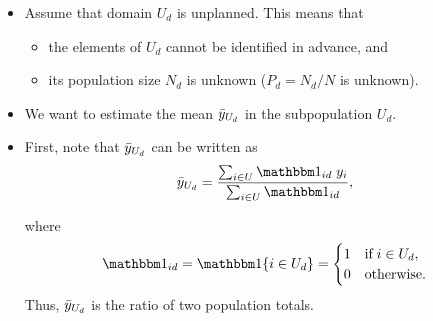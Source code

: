 \documentclass{my_eth_beamer}
\numberwithin{equation}{section}
\begin{document}
\begin{frame}
    \begin{itemize}
    \setlength{\itemsep}{4pt}
        \item Assume that domain $U_d$ is \alert{unplanned}. This means that
            \vspace{0.25em}
            \begin{itemize}
                \setlength{\itemsep}{6pt}
                \item the elements of $U_d$ \alert{cannot be identified} in
                    advance, and
                \item its population size $N_d$ is \alert{unknown}
                    ($P_d = N_d/N$ is unknown).
            \end{itemize}
        \vspace{0.25em}
        \item We want to estimate the \alert{mean} $\bar{y}_{U_d}$ in the
            \alert{subpopulation} $U_d$.
        \item First, note that $\bar{y}_{U_d}$ can be written as
            \begin{equation*}
                \widebar{y}_{U_d} =
                    \frac{\sum_{i \in U} \indicator_{id} \; y_i}{\sum_{i \in U}
                    \indicator_{id}},
            \end{equation*}

            \vspace{-0.5em}

            \noindent where
            \begin{equation*}
                \indicator_{id} = \indicator\{i \in U_d\} = \begin{cases}
                        1 & \text{if} \; i \in U_d,\\
                        0 & \text{otherwise}.
                    \end{cases}
            \end{equation*}
            \noindent Thus, $\bar{y}_{U_d}$ is the \alert{ratio} of two
            population totals.
    \end{itemize}
\end{frame}
\end{document}
